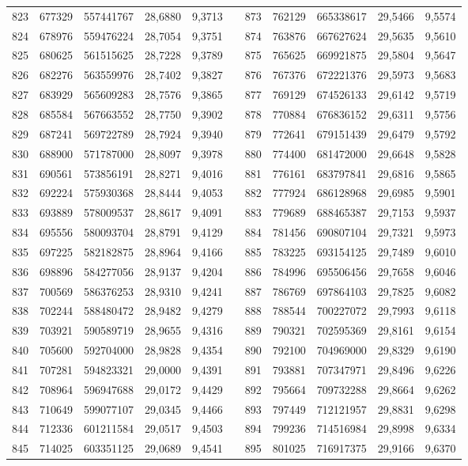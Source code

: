 \begin{longtable}{rrrrrrrrrrr}
823&677329&557441767&28,6880&9,3713&&873&762129&665338617&29,5466&9,5574\\
824&678976&559476224&28,7054&9,3751&&874&763876&667627624&29,5635&9,5610\\
825&680625&561515625&28,7228&9,3789&&875&765625&669921875&29,5804&9,5647\\
826&682276&563559976&28,7402&9,3827&&876&767376&672221376&29,5973&9,5683\\
827&683929&565609283&28,7576&9,3865&&877&769129&674526133&29,6142&9,5719\\
828&685584&567663552&28,7750&9,3902&&878&770884&676836152&29,6311&9,5756\\
829&687241&569722789&28,7924&9,3940&&879&772641&679151439&29,6479&9,5792\\
830&688900&571787000&28,8097&9,3978&&880&774400&681472000&29,6648&9,5828\\
831&690561&573856191&28,8271&9,4016&&881&776161&683797841&29,6816&9,5865\\
832&692224&575930368&28,8444&9,4053&&882&777924&686128968&29,6985&9,5901\\
833&693889&578009537&28,8617&9,4091&&883&779689&688465387&29,7153&9,5937\\
834&695556&580093704&28,8791&9,4129&&884&781456&690807104&29,7321&9,5973\\
835&697225&582182875&28,8964&9,4166&&885&783225&693154125&29,7489&9,6010\\
836&698896&584277056&28,9137&9,4204&&886&784996&695506456&29,7658&9,6046\\
837&700569&586376253&28,9310&9,4241&&887&786769&697864103&29,7825&9,6082\\
838&702244&588480472&28,9482&9,4279&&888&788544&700227072&29,7993&9,6118\\
839&703921&590589719&28,9655&9,4316&&889&790321&702595369&29,8161&9,6154\\
840&705600&592704000&28,9828&9,4354&&890&792100&704969000&29,8329&9,6190\\
841&707281&594823321&29,0000&9,4391&&891&793881&707347971&29,8496&9,6226\\
842&708964&596947688&29,0172&9,4429&&892&795664&709732288&29,8664&9,6262\\
843&710649&599077107&29,0345&9,4466&&893&797449&712121957&29,8831&9,6298\\
844&712336&601211584&29,0517&9,4503&&894&799236&714516984&29,8998&9,6334\\
845&714025&603351125&29,0689&9,4541&&895&801025&716917375&29,9166&9,6370\\

\end{longtable}
